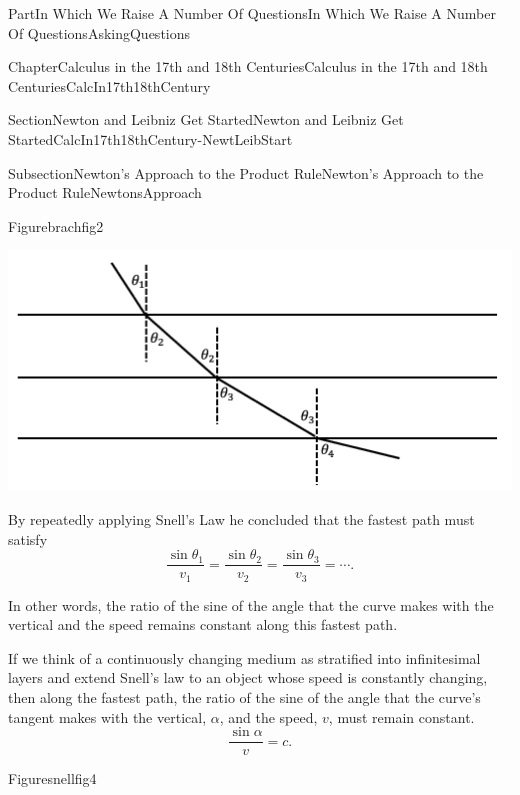 \documentclass[oneside,10pt,]{book}
\numberwithin{equation}{part}
\begin{document}
\begin{partptx}{Part}{In Which We Raise A Number Of Questions}{}{In Which We Raise A Number Of Questions}{}{}{AskingQuestions}
\begin{chapterptx}{Chapter}{Calculus in the 17th and 18th Centuries}{}{Calculus in the 17th and 18th Centuries}{}{}{CalcIn17th18thCentury}
\begin{sectionptx}{Section}{Newton and Leibniz Get Started}{}{Newton and Leibniz Get Started}{}{}{CalcIn17th18thCentury-NewtLeibStart}
\begin{subsectionptx}{Subsection}{Newton's Approach to the Product Rule}{}{Newton's Approach to the Product Rule}{}{}{NewtonsApproach}
\begin{figureptx}{Figure}{}{brachfig2}{}%
\begin{image}{0.125}{0.75}{0.125}{}%
\includegraphics[width=\linewidth]{external/images/brachfig2.png}
\end{image}%
\tcblower
\end{figureptx}%
By repeatedly applying Snell's Law he concluded that the fastest path must satisfy%
\begin{equation*}
\frac{\sin \theta_1}{v_1}=\frac{\sin \theta_2}{v_2}=\frac{\sin\theta_3}{v_3}=\cdots\text{.}
\end{equation*}
%
\par
In other words, the ratio of the sine of the angle that the curve makes with the vertical and the speed remains constant along this fastest path.%
\par
If we think of a continuously changing medium as stratified into infinitesimal layers and extend Snell's law to an object whose speed is constantly changing, then along the fastest path, the ratio of the sine of the angle that the curve's tangent makes with the vertical, \(\alpha\), and the speed, \(v\), must remain constant.%
\begin{equation*}
\frac{\sin\alpha}{v}=c\text{.}
\end{equation*}
%
\begin{figureptx}{Figure}{}{snellfig4}{}%
\begin{image}{0.25}{0.5}{0.25}{}%

\end{image}
\end{figureptx}
\end{subsectionptx}
\end{sectionptx}
\end{chapterptx}
\end{partptx}
\end{document}
